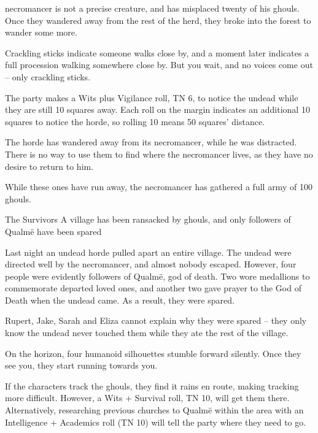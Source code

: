 \begin{multicols}{2}
\Gls{necromancer} is not a precise creature, and has misplaced twenty of his ghouls.
Once they wandered away from the rest of the herd, they broke into the forest to wander some more.

\begin{boxtext}

	Crackling sticks indicate someone walks close by, and a moment later indicates a full procession walking somewhere close by.
	But you wait, and no voices come out -- only crackling sticks.

\end{boxtext}

The party makes a Wits plus Vigilance roll, TN 6, to notice the undead while they are still 10 squares away.
Each roll on the margin indicates an additional 10 squares to notice the horde, so rolling 10 means 50 squares' distance.

The horde has wandered away from its necromancer, while he was distracted.
There is no way to use them to find where the necromancer lives, as they have no desire to return to him.

While these ones have run away, the necromancer has gathered a full army of 100 ghouls.

{The Survivors}%
{A village has been ransacked by ghouls, and only followers of Qualm\"{e} have been spared}%

Last night an undead horde pulled apart an entire village.  The undead were directed well by the necromancer, and almost nobody escaped.
However, four people were evidently followers of Qualm\"{e}, god of death.
Two wore medallions to commemorate departed loved ones, and another two gave prayer to the God of Death when the undead came.
As a result, they were spared.

Rupert, Jake, Sarah and Eliza cannot explain why they were spared -- they only know the undead never touched them while they ate the rest of the village.

\begin{boxtext}

	On the horizon, four humanoid silhouettes stumble forward silently.  Once they see you, they start running towards you.

\end{boxtext}

If the characters track the ghouls, they find it rains en route, making tracking more difficult.
However, a Wits + Survival roll, TN 10, will get them there.
Alternatively, researching previous churches to Qualm\"{e} within the area with an Intelligence + Academics roll (TN 10) will tell the party where they need to go.


\end{multicols}
